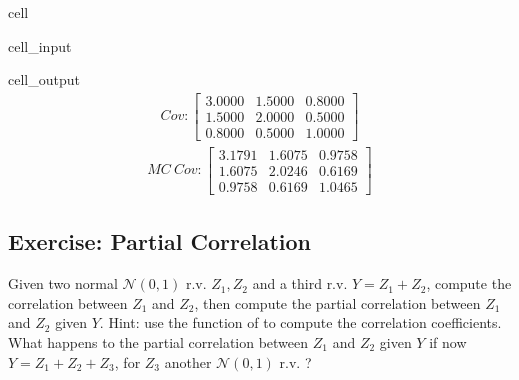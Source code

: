\documentclass[letterpaper,10pt,english]{jupyterBook}
\begin{document}
\begin{sphinxuseclass}{cell}
\begin{sphinxVerbatimInput}
\begin{sphinxuseclass}{cell_input}
\begin{sphinxVerbatim}[commandchars=\\\{\}]
\end{sphinxVerbatim}

\end{sphinxuseclass}\end{sphinxVerbatimInput}
\begin{sphinxVerbatimOutput}

\begin{sphinxuseclass}{cell_output}\begin{equation*}
\begin{split}\displaystyle Cov:\left[
\begin{array}{}
  3.0000 &  1.5000 &  0.8000\\
  1.5000 &  2.0000 &  0.5000\\
  0.8000 &  0.5000 &  1.0000
\end{array}
\right]\end{split}
\end{equation*}\begin{equation*}
\begin{split}\displaystyle MC\ Cov:\left[
\begin{array}{}
  3.1791 &  1.6075 &  0.9758\\
  1.6075 &  2.0246 &  0.6169\\
  0.9758 &  0.6169 &  1.0465
\end{array}
\right]\end{split}
\end{equation*}
\noindent{}

\end{sphinxuseclass}\end{sphinxVerbatimOutput}

\end{sphinxuseclass}

\subsection{Exercise: Partial Correlation}
\label{\detokenize{01:exercise-partial-correlation}}
\sphinxAtStartPar
Given two normal \(\mathcal{N}(0, 1)\) r.v. \(Z_1, Z_2\) and a third r.v. \(Y = Z_1 + Z_2\), compute the correlation between \(Z_1\) and \(Z_2\), then compute the partial correlation between \(Z_1\) and \(Z_2\) given \(Y\). Hint: use the function  of  to compute the correlation coefficients. What happens to the partial correlation between \(Z_1\) and \(Z_2\) given \(Y\) if now  \(Y = Z_1 + Z_2 + Z_3\), for \(Z_3\) another \(\mathcal{N}(0, 1)\) r.v. ?
\end{document}
